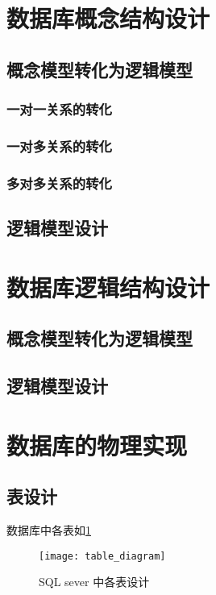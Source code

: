 \documentclass{myreport}
\begin{document}
\section{数据库概念结构设计}
  \subsection{概念模型转化为逻辑模型}
    \subsubsection{一对一关系的转化}

    \subsubsection{一对多关系的转化}

    \subsubsection{多对多关系的转化}

  \subsection{逻辑模型设计}



\section{数据库逻辑结构设计}
  \subsection{概念模型转化为逻辑模型}

  \subsection{逻辑模型设计}

\section{数据库的物理实现}
  \subsection{表设计}
    数据库中各表如\cref{fig:table_diagram}
    \begin{figure}[H]
      \centering
      \texttt{[image: table\_diagram]}
      \caption{SQL sever 中各表设计}
      \label{fig:table_diagram}
    \end{figure}
\end{document}
